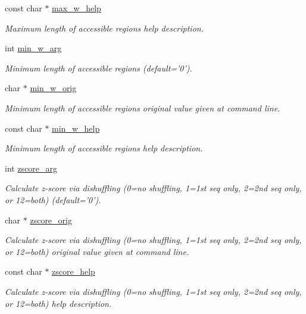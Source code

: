 \begin{DoxyCompactItemize}
const char $\ast$ \hyperlink{structgengetopt__args__info_a84421172a52bd1de77c3a500fddb731b}{max\+\_\+w\+\_\+help}
\begin{DoxyCompactList}\small\item\em Maximum length of accessible regions help description. \end{DoxyCompactList}\item 
int \hyperlink{structgengetopt__args__info_ab0d4deed1d0424a4131eaa7b40b9e4ab}{min\+\_\+w\+\_\+arg}
\begin{DoxyCompactList}\small\item\em Minimum length of accessible regions (default='0'). \end{DoxyCompactList}\item 
char $\ast$ \hyperlink{structgengetopt__args__info_a65ff1a2d7368adda94e83864d5d8c399}{min\+\_\+w\+\_\+orig}
\begin{DoxyCompactList}\small\item\em Minimum length of accessible regions original value given at command line. \end{DoxyCompactList}\item 
const char $\ast$ \hyperlink{structgengetopt__args__info_aaf033ec8b1593d0f2f6f6d28a9709622}{min\+\_\+w\+\_\+help}
\begin{DoxyCompactList}\small\item\em Minimum length of accessible regions help description. \end{DoxyCompactList}\item 
int \hyperlink{structgengetopt__args__info_a74d8c0d931f3466ef58a09fbabe05fa3}{zscore\+\_\+arg}
\begin{DoxyCompactList}\small\item\em Calculate z-\/score via dishuffling (0=no shuffling, 1=1st seq only, 2=2nd seq only, or 12=both) (default='0'). \end{DoxyCompactList}\item 
char $\ast$ \hyperlink{structgengetopt__args__info_aab048214690b4bb2aef5468cf1f796c8}{zscore\+\_\+orig}
\begin{DoxyCompactList}\small\item\em Calculate z-\/score via dishuffling (0=no shuffling, 1=1st seq only, 2=2nd seq only, or 12=both) original value given at command line. \end{DoxyCompactList}\item 
const char $\ast$ \hyperlink{structgengetopt__args__info_a34d3e383d7098991098429f67eeb331b}{zscore\+\_\+help}
\begin{DoxyCompactList}\small\item\em Calculate z-\/score via dishuffling (0=no shuffling, 1=1st seq only, 2=2nd seq only, or 12=both) help description. \end{DoxyCompactList}\item 

\end{DoxyCompactItemize}
